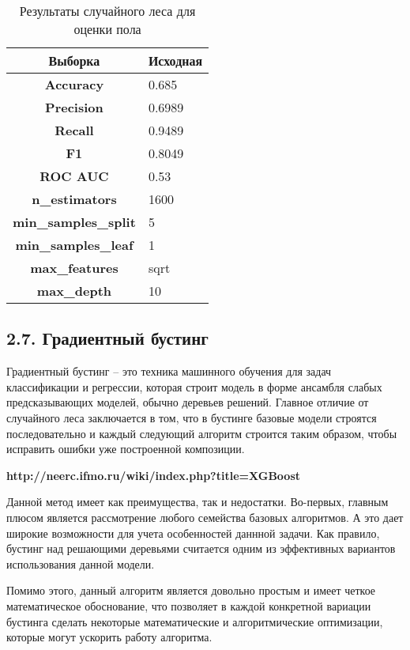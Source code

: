 \begin{table}[h!]
\centering
\begin{tabular}{|c|l|}
\hline
\textbf{Выборка}             & Исходная \\ \hline
\textbf{Accuracy}            & 0.685    \\ \hline
\textbf{Precision}           & 0.6989   \\ \hline
\textbf{Recall}              & 0.9489   \\ \hline
\textbf{F1}                  & 0.8049   \\ \hline
\textbf{ROC AUC}             & 0.53     \\ \hline
\textbf{n\_estimators}       & 1600     \\ \hline
\textbf{min\_samples\_split} & 5        \\ \hline
\textbf{min\_samples\_leaf}  & 1        \\ \hline
\textbf{max\_features}       & sqrt     \\ \hline
\textbf{max\_depth}          & 10       \\ \hline
\end{tabular}
\caption{Результаты случайного леса для оценки пола}
\label{table8}
\end{table}

\subsection{2.7. Градиентный бустинг}

Градиентный бустинг \cite{gradient boosting} -- это техника машинного обучения для задач классификации и регрессии, которая строит модель в форме ансамбля слабых предсказывающих моделей, обычно деревьев решений. Главное отличие от случайного леса заключается в том, что в бустинге базовые модели строятся последовательно и каждый следующий алгоритм строится таким образом, чтобы исправить ошибки уже построенной композиции.

\textbf{http://neerc.ifmo.ru/wiki/index.php?title=XGBoost}

Данной метод имеет как преимущества, так и недостатки. Во-первых, главным плюсом является рассмотрение любого семейства базовых алгоритмов. А это дает широкие возможности для учета особенностей даннной задачи. Как правило, бустинг над решающими деревьями считается одним из эффективных вариантов использования данной модели.

Помимо этого, данный алгоритм является довольно простым и имеет четкое математическое обоснование, что позволяет в каждой конкретной вариации бустинга сделать некоторые математические и алгоритмические оптимизации, которые могут ускорить работу алгоритма.

